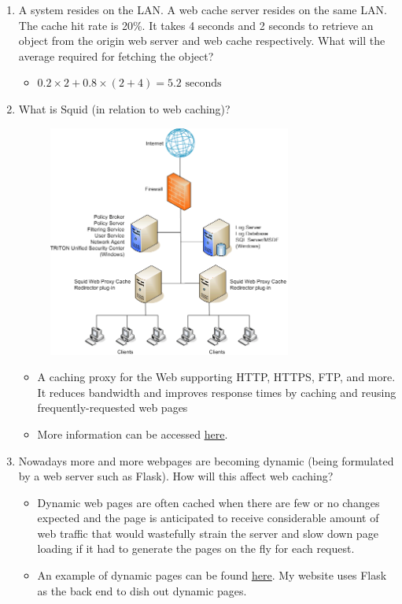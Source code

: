 \documentclass{article}
\begin{document}
\begin{enumerate}
\item A system resides on the LAN. A web cache server resides on the same LAN. The cache hit rate is 20\%. It takes 4 seconds and 2 seconds to retrieve an object from the origin web server and web cache respectively. What will the average required for fetching the object?

\begin{itemize}
\item $0.2 \times 2 + 0.8 \times (2 + 4) = 5.2 \text{ seconds }$
\end{itemize}
\newpage

\item What is Squid (in relation to web caching)?

\begin{figure}[!h]
\centering
\includegraphics[width=8cm]{Squid_Array2}
\end{figure}

\begin{itemize}
\item A caching proxy for the Web supporting HTTP, HTTPS, FTP, and more. It reduces bandwidth and improves response times by caching and reusing frequently-requested web pages
\item More information can be accessed \href{http://www.squid-cache.org/}{\underline{here}}.
\end{itemize}

\item Nowadays more and more webpages are becoming dynamic (being formulated by a web server such as Flask). How will this affect web caching?

\begin{itemize}
\item Dynamic web pages are often cached when there are few or no changes expected and the page is anticipated to receive considerable amount of web traffic that would wastefully strain the server and slow down page loading if it had to generate the pages on the fly for each request. 
\item An example of dynamic pages can be found \href{https://github.com/JaredDyreson/personal-website/blob/master/personalwebsite/templates/demos.html}{\underline{here}}. My website uses Flask as the back end to dish out dynamic pages.
\end{itemize}
\end{enumerate}
\end{document}
